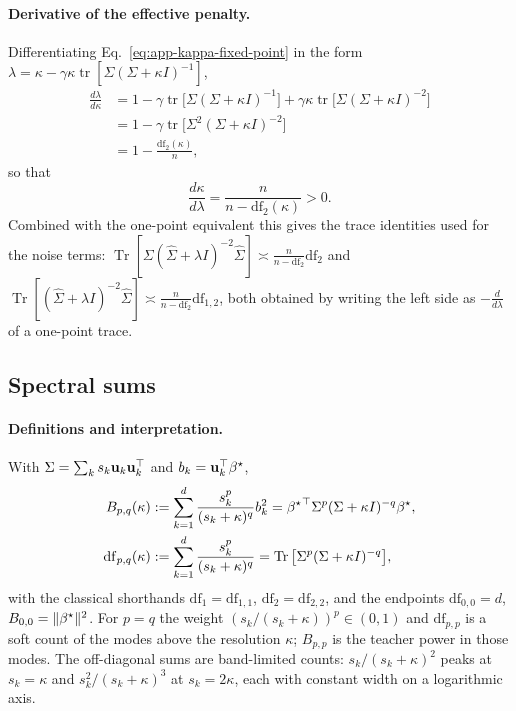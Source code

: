 {\paragraph{Derivative of the effective penalty.}
Differentiating Eq.~\ref{eq:app-kappa-fixed-point} in the form
$\lambda=\kappa-\gamma\kappa\operatorname{tr}[\Sigma(\Sigma+\kappa I)^{-1}]$,
\begin{align*}
\frac{d\lambda}{d\kappa}&=1-\gamma\operatorname{tr}\big[\Sigma(\Sigma+\kappa I)^{-1}\big]+\gamma\kappa\operatorname{tr}\big[\Sigma(\Sigma+\kappa I)^{-2}\big]
\\
&=1-\gamma\operatorname{tr}\big[\Sigma^2(\Sigma+\kappa I)^{-2}\big]\\
&=1-\frac{\mathrm{df}_2(\kappa)}{n},
\end{align*}
so that
\begin{equation}
\frac{d\kappa}{d\lambda}=\frac{n}{n-\mathrm{df}_2(\kappa)}>0 .
\label{eq:app-dkappa-dlambda}
\end{equation}
Combined with the one-point equivalent this gives the trace identities used
for the noise terms:
$\operatorname{Tr}[\Sigma(\hat\Sigma+\lambda I)^{-2}\hat\Sigma]\asymp\frac{n}{n-\mathrm{df}_2}\mathrm{df}_2$
and
$\operatorname{Tr}[(\hat\Sigma+\lambda I)^{-2}\hat\Sigma]\asymp\frac{n}{n-\mathrm{df}_2}\mathrm{df}_{1,2}$,
both obtained by writing the left side as $-\frac{d}{d\lambda}$ of a
one-point trace.

\subsection{Spectral sums}

\paragraph{Definitions and interpretation.}
With $\Sigma=\sum_ks_k{\mathbf{u}}_k{\mathbf{u}}_k^\top$ and $b_k={\mathbf{u}}_k^\top{\beta^{\star}}$,
\begin{equation}
\begin{aligned}
B_{p,q}(\kappa)&:=\sum_{k=1}^d\frac{s_k^p}{(s_k+\kappa)^q}b_k^2
={{\beta^{\star}}}^\top\Sigma^p(\Sigma+\kappa I)^{-q}{\beta^{\star}},\\
\mathrm{df}_{p,q}(\kappa)&:=\sum_{k=1}^d\frac{s_k^p}{(s_k+\kappa)^q}
=\operatorname{Tr}\big[\Sigma^p(\Sigma+\kappa I)^{-q}\big],
\end{aligned}
\end{equation}
with the classical shorthands $\mathrm{df}_1=\mathrm{df}_{1,1}$,
$\mathrm{df}_2=\mathrm{df}_{2,2}$, and the endpoints $\mathrm{df}_{0,0}=d$,
$B_{0,0}=\|{\beta^{\star}}\|^2$.  For $p=q$ the weight $(s_k/(s_k+\kappa))^p\in(0,1)$
and $\mathrm{df}_{p,p}$ is a soft count of the modes above the resolution
$\kappa$; $B_{p,p}$ is the teacher power in those modes.  The off-diagonal
sums are band-limited counts: $s_k/(s_k+\kappa)^2$ peaks at $s_k=\kappa$ and
$s_k^2/(s_k+\kappa)^3$ at $s_k=2\kappa$, each with constant width on a
logarithmic axis.

}
